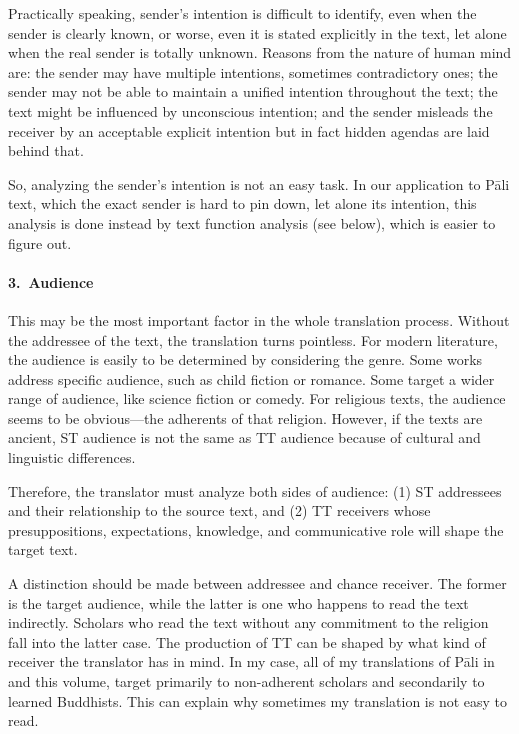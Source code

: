 Practically speaking, sender's intention is difficult to identify, even when the sender is clearly known, or worse, even it is stated explicitly in the text, let alone when the real sender is totally unknown. Reasons from the nature of human mind are: the sender may have multiple intentions, sometimes contradictory ones; the sender may not be able to maintain a unified intention throughout the text; the text might be influenced by unconscious intention; and the sender misleads the receiver by an acceptable explicit intention but in fact hidden agendas are laid behind that.

So, analyzing the sender's intention is not an easy task. In our application to P\=ali text, which the exact sender is hard to pin down, let alone its intention, this analysis is done instead by text function analysis (see below), which is easier to figure out.

\paragraph*{3.\ Audience} This may be the most important factor in the whole translation process. Without the addressee of the text, the translation turns pointless. For modern literature, the audience is easily to be determined by considering the genre. Some works address specific audience, such as child fiction or romance. Some target a wider range of audience, like science fiction or comedy. For religious texts, the audience seems to be obvious---the adherents of that religion. However, if the texts are ancient, ST audience is not the same as TT audience because of cultural and linguistic differences.

Therefore, the translator must analyze both sides of audience: (1) ST addressees and their relationship to the source text, and (2) TT receivers whose presuppositions, expectations, knowledge, and communicative role will shape the target text.

A distinction should be made between addressee and chance receiver. The former is the target audience, while the latter is one who happens to read the text indirectly. Scholars who read the text without any commitment to the religion fall into the latter case. The production of TT can be shaped by what kind of receiver the translator has in mind. In my case, all of my translations of P\=ali in  and this volume, target primarily to non-adherent scholars and secondarily to learned Buddhists. This can explain why sometimes my translation is not easy to read.

